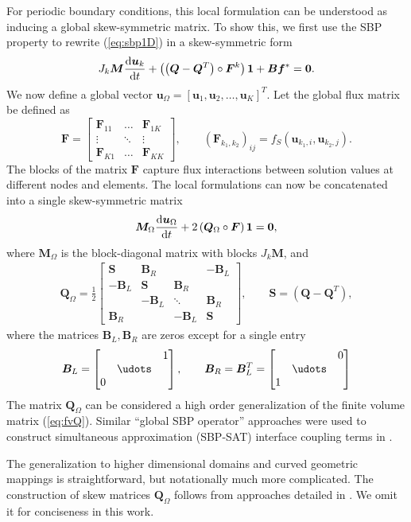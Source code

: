 \documentclass{article}
\newcommand{\td}[2]{\frac{{\rm d}#1}{{\rm d}{ {#2}}}}
\newcommand{\LRp}[1]{\left( #1 \right)}
\newcommand{\LRs}[1]{\left[ #1 \right]}
\newcommand{\eqlab}[1]{\begin{align}#1\end{align}}
\newcommand{\bmat}[1]{\begin{bmatrix}#1\end{bmatrix}}
\begin{document}
For periodic boundary conditions, this local formulation can be understood as inducing a global skew-symmetric matrix.  To show this, we first use the SBP property to rewrite (\ref{eq:sbp1D}) in a skew-symmetric form \cite{chan2019skew}
\eqlab{
J_k {\bm{M}} \td{\bm{u}_k}{t} + \LRp{\LRp{\bm{Q}-\bm{Q}^T} \circ \bm{F}^k}\bm{1} + \bm{B}\bm{f}^* = \bm{0}.
\label{eq:sbp1D}
}
We now define a global vector $\bm{u}_{\Omega} = \LRs{\bm{u}_1, \bm{u}_2, \ldots, \bm{u}_K}^T$.  Let the global flux matrix be defined as
\[
\bm{F} = \bmat{
\bm{F}_{11} & \ldots & \bm{F}_{1K}\\
\vdots & \ddots & \vdots\\
\bm{F}_{K1} & \ldots & \bm{F}_{KK}
}, \qquad \LRp{\bm{F}_{k_1,k_2}}_{ij} = f_S(\bm{u}_{k_1,i}, \bm{u}_{k_2,j}).
\]
The blocks of the matrix $\bm{F}$ capture flux interactions between solution values at different nodes and elements.  
The local formulations can now be concatenated into a single skew-symmetric matrix
\[
\bm{M}_{\Omega}\td{\bm{u}_{\Omega}}{t} + 2\LRp{\bm{Q}_{\Omega}\circ \bm{F}}\bm{1} = \bm{0},
\]
where $\bm{M}_{\Omega}$ is the block-diagonal matrix with blocks $J_k\bm{M}$, and 
\eqlab{
\bm{Q}_{\Omega} = \frac{1}{2}\bmat{
\bm{S} &\bm{B}_R & & -\bm{B}_L\\
-\bm{B}_L& \bm{S} & \bm{B}_R&\\
& -\bm{B}_L & \ddots & \bm{B}_R\\
\bm{B}_R& & -\bm{B}_L & \bm{S}
}, \qquad \bm{S} = \LRp{\bm{Q}-\bm{Q}^T},
\label{eq:sbpmat}
}
where the matrices $\bm{B}_L,\bm{B}_R$ are zeros except for a single entry
\[
\bm{B}_L = \bmat{
 & &1\\
& \udots & \\
0 & & 
}, \qquad \bm{B}_R = \bm{B}_L^T = \bmat{
 & & 0\\
& \udots & \\
1 & & 
}
\]
The matrix $\bm{Q}_{\Omega}$ can be considered a high order generalization of the finite volume matrix (\ref{eq:fvQ}).  Similar ``global SBP operator'' approaches were used to construct simultaneous approximation (SBP-SAT) interface coupling terms in \cite{crean2018entropy, chan2018efficient, fernandez2019entropy}.  

The generalization to higher dimensional domains and curved geometric mappings is straightforward, but notationally much more complicated.  The construction of skew matrices $\bm{Q}_{\Omega}$ follows from approaches detailed in \cite{crean2018entropy, chan2017discretely, chan2018discretely, chan2018efficient, chan2019skew, hicken2020entropy}.  We omit it for conciseness in this work.  
\end{document}
